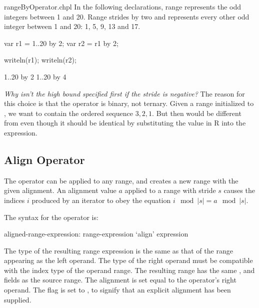 \begin{chapelexample}{rangeByOperator.chpl}
In the following declarations, range  represents the odd integers
between 1 and 20. Range  strides  by two and represents
every other odd integer between 1 and 20: 1, 5, 9, 13 and 17.
\begin{chapel}
var r1 = 1..20 by 2;
var r2 = r1 by 2;
\end{chapel}
\begin{chapelpost}
writeln(r1);
writeln(r2);
\end{chapelpost}
\begin{chapeloutput}
1..20 by 2
1..20 by 4
\end{chapeloutput}
\end{chapelexample}

\begin{rationale}
{\it Why isn't the high bound specified first if the stride is
negative?}  The reason for this choice is that the  operator
is binary, not ternary.  Given a range  initialized
to , we want  to contain the ordered sequence
$3,2,1$.  But then  would be different from  even though it should be identical by substituting the value in
R into the expression.
\end{rationale}


\subsection{Align Operator}
\label{Align_Operator}

The  operator can be applied to any range, and creates a new range
with the given alignment.  An alignment value $a$ applied to a range with stride $s$ causes the indices $i$ produced by an iterator
to obey the equation $i\!\mod |s| = a\!\mod |s|$.

The syntax for the  operator is:
\begin{syntax}
aligned-range-expression:
  range-expression `align' expression
\end{syntax}
\noindent The type of the resulting range expression is the same as that of the
range appearing as the left operand.  The type of the right operand must be
compatible with the index type of the operand range.  
The resulting range has the
same ,  and  fields as the source range. The
alignment is set equal to the  operator's right operand.
The  flag is set to , to signify that an explicit
alignment has been supplied.

